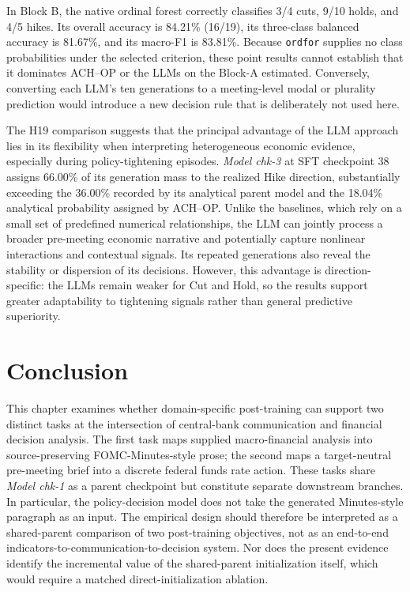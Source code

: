 In Block B, the native ordinal forest correctly classifies 3/4 cuts, 9/10
holds, and 4/5 hikes. Its overall accuracy is 84.21\% (16/19), its
three-class balanced accuracy is 81.67\%, and its macro-F1 is 83.81\%.
Because \texttt{ordfor} supplies no class probabilities under the selected
criterion, these point results cannot establish that it dominates ACH--OP or
the LLMs on the Block-A estimated. Conversely, converting each LLM's ten
generations to a meeting-level modal or plurality prediction would introduce a
new decision rule that is deliberately not used here.


The H19 comparison suggests that the principal advantage of the LLM approach lies in its flexibility when interpreting heterogeneous economic evidence, especially during policy-tightening episodes. \textit{Model chk-3} at SFT checkpoint 38 assigns 66.00\% of its generation mass to the realized Hike direction, substantially exceeding the 36.00\% recorded by its analytical parent model and the 18.04\% analytical probability assigned by ACH--OP. Unlike the baselines, which rely on a small set of predefined numerical relationships, the LLM can jointly process a broader pre-meeting economic narrative and potentially capture nonlinear interactions and contextual signals. Its repeated generations also reveal the stability or dispersion of its decisions. However, this advantage is direction-specific: the LLMs remain weaker for Cut and Hold, so the results support greater adaptability to tightening signals rather than general predictive superiority.





\section{Conclusion}\label{ch2:sec:conclusion}

This chapter examines whether domain-specific post-training can support two
distinct tasks at the intersection of central-bank communication and financial
decision analysis. The first task maps supplied macro-financial analysis into
source-preserving FOMC-Minutes-style prose; the second maps a target-neutral
pre-meeting brief into a discrete federal funds rate action. These tasks share
\textit{Model chk-1} as a parent checkpoint but constitute separate downstream
branches. In particular, the policy-decision model does not take the generated
Minutes-style paragraph as an input. The empirical design should therefore be
interpreted as a shared-parent comparison of two post-training objectives, not
as an end-to-end indicators-to-communication-to-decision system. Nor does the
present evidence identify the incremental value of the shared-parent
initialization itself, which would require a matched direct-initialization
ablation.

